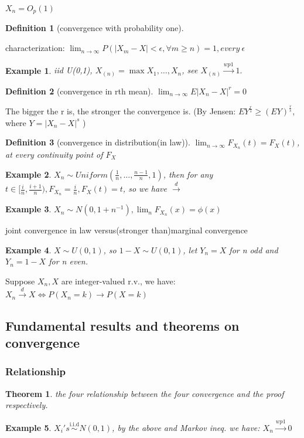 \documentclass{ctexart}
\newtheorem{theorem}{Theorem}[subsection]
\newtheorem{definition}{Definition}[subsection]
\newtheorem{example}{Example}[subsection]
\begin{document}
\(X_n=O_p(1)\) 
\begin{definition}[convergence with probability one]
   
\end{definition}
characterization: \(\lim_{n\to \infty} P(|X_m-X|<\epsilon,\forall m\ge n)=1,every\ \epsilon\) 
\begin{example}
  iid U(0,1), \(X_{(n)}=\max{X_1,\ldots,X_n}\), see \(X_{(n)}\xrightarrow{wp1}1.\)  
\end{example}
\begin{definition}[convergence in rth mean]
  \(\lim_{n\to \infty}E|X_n-X|^r=0\) 
\end{definition}
The bigger the r is, the stronger the convergence is. (By Jensen: \(EY^{\frac{r}{s}}\ge (EY)^{\frac{r}{s}}\), where \(Y=|X_n-X|^s\)  )
\begin{definition}[convergence in distribution(in law)]
  \(\lim_{n\to \infty}F_{X_n}(t)=F_X(t)\), at every continuity point of \(F_X\)  
\end{definition}
\begin{example}
  \(X_n\sim Uniform(\frac{1}{n},\ldots,\frac{n-1}{n},1)\), then for any \(t\in [\frac{i}{n},\frac{i+1}{n}), F_{X_n}=\frac{i}{n},F_X(t)=t\), so we have \(\xrightarrow{d}\)   
\end{example}
\begin{example}
  \(X_n\sim N(0,1+n ^{-1}),\lim_n F_{X_n}(x)=\phi(x)\) 
\end{example}
joint convergence in law versus(stronger than)marginal convergence
\begin{example}
  \(X\sim U(0,1)\), so \(1-X \sim U(0,1)\), let $Y_n=X$ for n odd and \(Y_n=1-X\) for n even.   
\end{example}

Suppose \(X_n,X\) are integer-valued r.v., we have: \(X_n \xrightarrow{d}X \iff P(X_n=k)\to P(X=k)\)  

\subsection{Fundamental results and theorems on convergence}
\subsubsection{Relationship}
\begin{theorem}
  the four relationship between the four convergence and the proof respectively. 
\end{theorem}
\begin{example}
  \(X_i's \overset{\text{i.i.d}}{\sim}N(0,1)\), by the above and Markov ineq. we have: \(X_n \xrightarrow{wp1}0\)  
\end{example}
\end{document}
